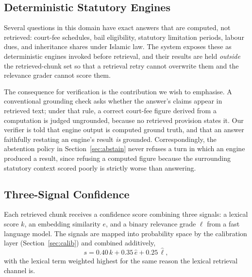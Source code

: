 \documentclass[conference]{IEEEtran}
\begin{document}
\subsection{Deterministic Statutory Engines}
\label{sec:tools}
Several questions in this domain have exact answers that are computed, not
retrieved: court-fee schedules, bail eligibility, statutory limitation periods,
labour dues, and inheritance shares under Islamic law. The system exposes these
as deterministic engines invoked before retrieval, and their results are held
\emph{outside} the retrieved-chunk set so that a retrieval retry cannot
overwrite them and the relevance grader cannot score them.

The consequence for verification is the contribution we wish to emphasise. A
conventional grounding check asks whether the answer's claims appear in
retrieved text; under that rule, a correct court-fee figure derived from a
computation is judged ungrounded, because no retrieved provision states it. Our
verifier is told that engine output is computed ground truth, and that an answer
faithfully restating an engine's result \emph{is} grounded. Correspondingly, the
abstention policy in Section~\ref{sec:abstain} never refuses a turn in which an
engine produced a result, since refusing a computed figure because the
surrounding statutory context scored poorly is strictly worse than answering.

\subsection{Three-Signal Confidence}
\label{sec:scoring}
Each retrieved chunk receives a confidence score combining three signals: a
lexical score $k$, an embedding similarity $e$, and a binary relevance grade
$\ell$ from a fast language model. The signals are mapped into probability space
by the calibration layer (Section~\ref{sec:calib}) and combined additively,
\begin{equation}
s = 0.40\,k + 0.35\,\hat{e} + 0.25\,\hat{\ell},
\label{eq:score}
\end{equation}
with the lexical term weighted highest for the same reason the lexical
retrieval channel is.
\end{document}
